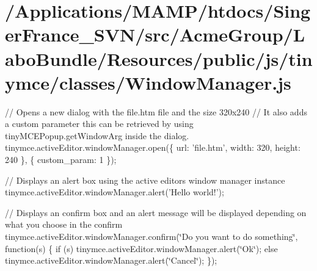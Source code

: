 \hypertarget{_2_applications_2_m_a_m_p_2htdocs_2_singer_france__s_v_n_2src_2_acme_group_2_labo_bundle_2_resoue5218b440f483bc8f45df2e8306552fa}{\section{/\+Applications/\+M\+A\+M\+P/htdocs/\+Singer\+France\+\_\+\+S\+V\+N/src/\+Acme\+Group/\+Labo\+Bundle/\+Resources/public/js/tinymce/classes/\+Window\+Manager.\+js}
}
// Opens a new dialog with the file.\+htm file and the size 320x240 // It also adds a custom parameter this can be retrieved by using tiny\+M\+C\+E\+Popup.\+get\+Window\+Arg inside the dialog. tinymce.\+active\+Editor.\+window\+Manager.\+open(\{ url\+: 'file.\+htm', width\+: 320, height\+: 240 \}, \{ custom\+\_\+param\+: 1 \});

// Displays an alert box using the active editors window manager instance tinymce.\+active\+Editor.\+window\+Manager.\+alert('Hello world!');

// Displays an confirm box and an alert message will be displayed depending on what you choose in the confirm tinymce.\+active\+Editor.\+window\+Manager.\+confirm(\char`\"{}\+Do you want to do something\char`\"{}, function(s) \{ if (s) tinymce.\+active\+Editor.\+window\+Manager.\+alert(\char`\"{}\+Ok\char`\"{}); else tinymce.\+active\+Editor.\+window\+Manager.\+alert(\char`\"{}\+Cancel\char`\"{}); \});


\begin{DoxyCodeInclude}
\end{DoxyCodeInclude}
 